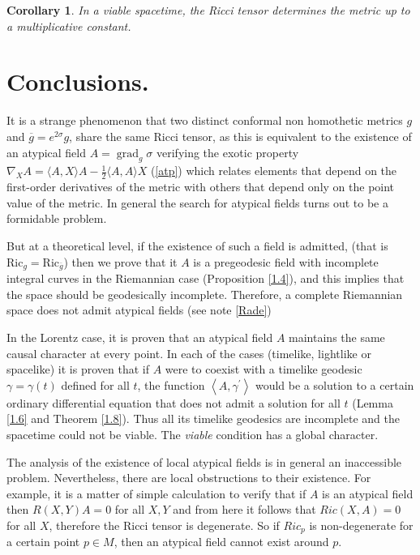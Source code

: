 \documentclass{amsart}%
\theoremstyle{plain}
\newtheorem{corollary}{Corollary}
\numberwithin{equation}{section}
\begin{document}
\begin{corollary}
In a viable spacetime, the Ricci tensor determines the metric up to a
multiplicative constant.
\end{corollary}

\section{Conclusions.}

It is a strange phenomenon that two distinct conformal non homothetic metrics
$g$ and $\overline{g}=e^{2\sigma}g$, share the same Ricci tensor, as this is
equivalent to the existence of an atypical field $A=\operatorname{grad}%
_{g}\sigma$ verifying the exotic property $\nabla_{X}A=\langle A,X\rangle
A-\frac{1}{2}\langle A,A\rangle X$ (\ref{atp}) which relates elements that
depend on the first-order derivatives of the metric with others that depend
only on the point value of the metric. In general the search for atypical
fields turns out to be a formidable problem.

But at a theoretical level, if the existence of such a field is admitted,
(that is $\mathrm{Ric}_{g}=\mathrm{Ric}_{\overline{g}}$) then we prove that it
$A$ is a pregeodesic field with incomplete integral curves in the Riemannian
case (Proposition \ref{1.4}), and this implies that the space should be
geodesically incomplete. Therefore, a complete Riemannian space does not admit
atypical fields (see note \ref{Rade})

In the Lorentz case, it is proven that an atypical field $A$ maintains the
same causal character at every point. In each of the cases (timelike,
lightlike or spacelike) it is proven that if $A$ were to coexist with a
timelike geodesic $\gamma=\gamma\left(  t\right)  $ defined for all $t$, the
function $\left\langle A,\gamma^{\prime}\right\rangle $ would be a solution to
a certain ordinary differential equation that does not admit a solution for
all $t$ (Lemma \ref{1.6} and Theorem \ref{1.8}). Thus all its timelike
geodesics are incomplete and the spacetime could not be viable. The
\emph{viable} condition has a global character.

The analysis of the existence of local atypical fields is in general an
inaccessible problem. Nevertheless, there are local obstructions to their
existence. For example, it is a matter of simple calculation to verify that if
$A$ is an atypical field then $R\left(  X,Y\right)  A=0$ for all $X,Y$ and
from here it follows that $Ric\left(  X,A\right)  =0$ for all $X$, therefore
the Ricci tensor is degenerate. So if $Ric_{p}$ is non-degenerate for a
certain point $p\in M$, then an atypical field cannot exist around $p.$
\end{document}
